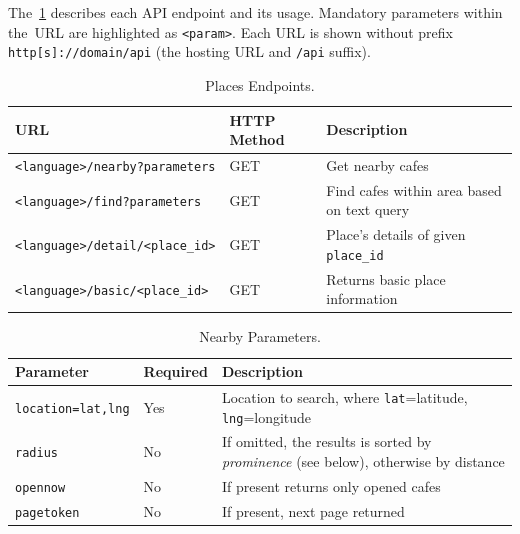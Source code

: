 The~\cref{table:cta-places} describes each API endpoint and its usage. Mandatory parameters within the~URL are highlighted as \verb|<param>|. Each URL is shown without prefix \verb|http[s]://domain/api| (the hosting URL and \verb|/api| suffix).
\begin{table}[ht]
\centering
\begin{tabularx}{\textwidth}{|l|l|X|}
\hline
\textbf{URL} & \textbf{HTTP Method} & \textbf{Description} \\ \hline
\verb|<language>/nearby?parameters| & GET & Get nearby cafes \\ \hline
\verb|<language>/find?parameters| & GET & Find cafes within area based on text query \\ \hline
\verb|<language>/detail/<place_id>| & GET & Place's details of given \verb|place_id| \\ \hline
\verb|<language>/basic/<place_id>| & GET & Returns basic place information \\ \hline
\end{tabularx}
\caption{Places Endpoints.}
\label{table:cta-places}
\end{table}
\begin{table}[ht]
\centering
\begin{tabularx}{\textwidth}{|l|l|X|}
\hline
\textbf{Parameter} & \textbf{Required} & \textbf{Description} \\ \hline
\verb|location=lat,lng| & Yes & Location to search, where \verb|lat|=latitude, \verb|lng|=longitude \\ \hline
\verb|radius| & No & If omitted, the results is sorted by \textit{prominence} (see below), otherwise by distance\\ \hline
\verb|opennow| & No & If present returns only opened cafes\\ \hline
\verb|pagetoken| & No & If present, next page returned\\ \hline
\end{tabularx}
\caption{Nearby Parameters.}
\label{table:cta-nearby-params}
\end{table}

